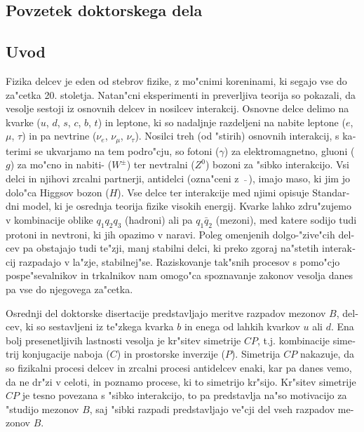 \begin{otherlanguage}{slovene}
\chapter{Povzetek doktorskega dela}
\section{Uvod}
Fizika delcev je eden od stebrov fizike, z mo"cnimi koreninami, ki segajo vse do za"cetka 20. stoletja. Natan"cni eksperimenti in preverljiva teorija so pokazali, da vesolje sestoji iz osnovnih delcev in nosilcev interakcij. Osnovne delce delimo na kvarke ($u$, $d$, $s$, $c$, $b$, $t$) in leptone, ki so nadaljnje razdeljeni na nabite leptone ($e$, $\mu$, $\tau$) in pa nevtrine ($\nu_e$, $\nu_\mu$, $\nu_\tau$). Nosilci treh (od "stirih) osnovnih interakcij, s katerimi se ukvarjamo na tem podro"cju, so fotoni ($\gamma$) za elektromagnetno, gluoni ($g$) za mo"cno in nabiti- ($W^\pm$) ter nevtralni ($Z^0$) bozoni za "sibko interakcijo. Vsi delci in njihovi zrcalni partnerji, antidelci (ozna"ceni z $~\bar {}~$), imajo maso, ki jim jo dolo"ca Higgsov bozon ($H$). Vse delce ter interakcije med njimi opisuje Standardni model, ki je osrednja teorija fizike visokih energij. Kvarke lahko zdru"zujemo v kombinacije oblike $q_1 q_2 q_3$ (hadroni) ali pa $q_1 \bar{q}_2$ (mezoni), med katere sodijo tudi protoni in nevtroni, ki jih opazimo v naravi. Poleg omenjenih dolgo-"zive"cih delcev pa obstajajo tudi te"zji, manj stabilni delci, ki preko zgoraj na"stetih interakcij razpadajo v la"zje, stabilnej"se. Raziskovanje tak"snih procesov s pomo"cjo pospe"sevalnikov in trkalnikov nam omogo"ca spoznavanje zakonov vesolja danes pa vse do njegovega za"cetka.

Osrednji del doktorske disertacije predstavljajo meritve razpadov mezonov $B$, delcev, ki so sestavljeni iz te"zkega kvarka $b$ in enega od lahkih kvarkov $u$ ali $d$. Ena bolj presenetljivih lastnosti vesolja je kr"sitev simetrije $CP$, t.j. kombinacije simetrij konjugacije naboja ($C$) in prostorske inverzije ($P$). Simetrija $CP$ nakazuje, da so fizikalni procesi delcev in zrcalni procesi antidelcev enaki, kar pa danes vemo, da ne dr"zi v celoti, in poznamo procese, ki to simetrijo kr"sijo. Kr"sitev simetrije $CP$ je tesno povezana s "sibko interakcijo, to pa predstavlja na"so motivacijo za "studijo mezonov $B$, saj "sibki razpadi predstavljajo ve"cji del vseh razpadov mezonov $B$.


\end{otherlanguage}
